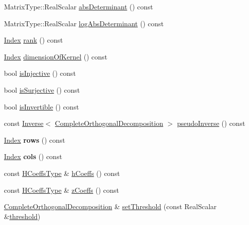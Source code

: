 \begin{DoxyCompactItemize}
\item 
Matrix\+Type\+::\+Real\+Scalar \hyperlink{group___q_r___module_a8a9b53dbe4665224699f06d6635d75b7}{abs\+Determinant} () const
\item 
Matrix\+Type\+::\+Real\+Scalar \hyperlink{group___q_r___module_a5b38f6d1938b3d08376898b24fa39a0a}{log\+Abs\+Determinant} () const
\item 
\hyperlink{namespace_eigen_a62e77e0933482dafde8fe197d9a2cfde}{Index} \hyperlink{group___q_r___module_af348f64b26f8467a020062c22b748806}{rank} () const
\item 
\hyperlink{namespace_eigen_a62e77e0933482dafde8fe197d9a2cfde}{Index} \hyperlink{group___q_r___module_aca2b59560c4851b7d7701872990a3426}{dimension\+Of\+Kernel} () const
\item 
bool \hyperlink{group___q_r___module_a2740067b81ec3e0ad20a2bea9a5a475f}{is\+Injective} () const
\item 
bool \hyperlink{group___q_r___module_a53dd287d3e1bbc548595d63880fd51bf}{is\+Surjective} () const
\item 
bool \hyperlink{group___q_r___module_a7c4f24f868295349a3bb99e5f217b069}{is\+Invertible} () const
\item 
const \hyperlink{class_eigen_1_1_inverse}{Inverse}$<$ \hyperlink{group___q_r___module_class_eigen_1_1_complete_orthogonal_decomposition}{Complete\+Orthogonal\+Decomposition} $>$ \hyperlink{group___q_r___module_a3c89639299720ce089435d26d6822d6f}{pseudo\+Inverse} () const
\item 
\mbox{\label{group___q_r___module_ae49c60b9b4d7f74dc79a94bf20a14142}} 
\hyperlink{namespace_eigen_a62e77e0933482dafde8fe197d9a2cfde}{Index} {\bfseries rows} () const
\item 
\mbox{\label{group___q_r___module_a41e9ee4b8bd05c9021fd066169e1d76c}} 
\hyperlink{namespace_eigen_a62e77e0933482dafde8fe197d9a2cfde}{Index} {\bfseries cols} () const
\item 
const \hyperlink{class_eigen_1_1internal_1_1_tensor_lazy_evaluator_writable}{H\+Coeffs\+Type} \& \hyperlink{group___q_r___module_ad25a868ecd499d6dda0119e4d3659504}{h\+Coeffs} () const
\item 
const \hyperlink{class_eigen_1_1internal_1_1_tensor_lazy_evaluator_writable}{H\+Coeffs\+Type} \& \hyperlink{group___q_r___module_a0b28c24992d313d4b04d109dcc7e5220}{z\+Coeffs} () const
\item 
\hyperlink{group___q_r___module_class_eigen_1_1_complete_orthogonal_decomposition}{Complete\+Orthogonal\+Decomposition} \& \hyperlink{group___q_r___module_aa9c9f7cbde9d58ca5552381b70ad8d82}{set\+Threshold} (const Real\+Scalar \&\hyperlink{group___q_r___module_a3909f07268496c0f08f1b57331d91075}{threshold})

\end{DoxyCompactItemize}
